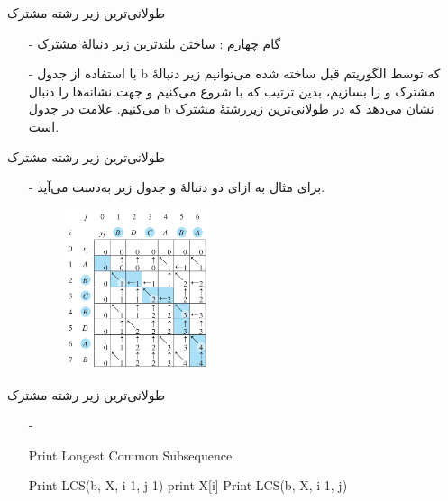 \begin{frame}{‌طولانی‌ترین زیر رشته مشترک}
\begin{itemize}\itemr
\item[-]
گام چهارم : ساختن بلندترین زیر دنبالهٔ مشترک
\item[-]
با استفاده از جدول b که توسط الگوریتم قبل ساخته شده می‌توانیم زیر دنبالهٔ مشترک
و
را بسازیم، بدین ترتیب که با
شروع می‌کنیم و جهت نشانه‌ها را دنبال می‌کنیم. علامت
\m{\nwarrow}
در جدول b نشان می‌دهد که
در طولانی‌ترین زیررشتهٔ مشترک است.
\end{itemize}
\end{frame}


\begin{frame}{‌طولانی‌ترین زیر رشته مشترک}
\begin{itemize}\itemr
\item[-]
برای مثال به ازای دو دنبالهٔ
و
جدول زیر به‌دست می‌آید.
\begin{figure}
\includegraphics[width=0.4\textwidth]{figs/chap04/lcs-example}
\end{figure}
\end{itemize}
\end{frame}


\begin{frame}{‌طولانی‌ترین زیر رشته مشترک}
\begin{itemize}\itemr
\item[-]
\begin{algorithm}[H]\alglr
  \caption{Print Longest Common Subsequence} 
  \begin{algorithmic}[1]
				\State \Return {}
		\EndIf
			\State Print-LCS(b, X, i-1, j-1)
			\State print X[i] 
			\State Print-LCS(b, X, i-1, j)
		\EndIf
  \end{algorithmic}
  \label{alg:merge}
\end{algorithm}  
\end{itemize}
\end{frame}




